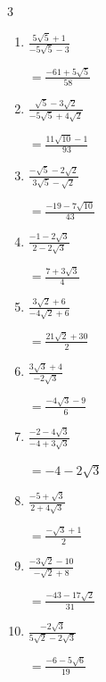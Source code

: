 \begin{multicols}{3}
\begin{enumerate}
        $\displaystyle =\frac{19+11\sqrt{2}}{7}$

\columnbreak %

  \item $\displaystyle \frac{5\sqrt{5}+1}{-5\sqrt{5}-3}$

        $\displaystyle =\frac{-61+5\sqrt{5}}{58}$

  \item $\displaystyle \frac{\sqrt{5}-3\sqrt{2}}{-5\sqrt{5}+4\sqrt{2}}$

        $\displaystyle =\frac{11\sqrt{10}-1}{93}$

  \item $\displaystyle \frac{-\sqrt{5}-2\sqrt{2}}{3\sqrt{5}-\sqrt{2}}$

        $\displaystyle =\frac{-19-7\sqrt{10}}{43}$

  \item $\displaystyle \frac{-1-2\sqrt{3}}{2-2\sqrt{3}}$

        $\displaystyle =\frac{7+3\sqrt{3}}{4}$

  \item $\displaystyle \frac{3\sqrt{2}+6}{-4\sqrt{2}+6}$

        $\displaystyle =\frac{21\sqrt{2}+30}{2}$

\columnbreak %

\resetques

  \item $\displaystyle \frac{3\sqrt{3}+4}{-2\sqrt{3}}$

        $\displaystyle =\frac{-4\sqrt{3}-9}{6}$

  \item $\displaystyle \frac{-2-4\sqrt{3}}{-4+3\sqrt{3}}$

        $\displaystyle =-4-2\sqrt{3}$

  \item $\displaystyle \frac{-5+\sqrt{3}}{2+4\sqrt{3}}$

        $\displaystyle =\frac{-\sqrt{3}+1}{2}$

  \item $\displaystyle \frac{-3\sqrt{2}-10}{-\sqrt{2}+8}$

        $\displaystyle =\frac{-43-17\sqrt{2}}{31}$

  \item $\displaystyle \frac{-2\sqrt{3}}{5\sqrt{2}-2\sqrt{3}}$

        $\displaystyle =\frac{-6-5\sqrt{6}}{19}$

\columnbreak %


\end{enumerate}
\end{multicols}
